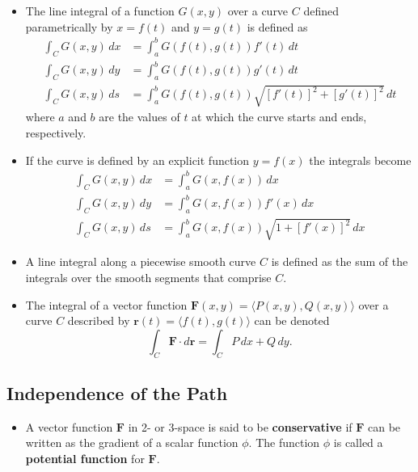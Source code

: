 \documentclass{article}
\begin{document}
\begin{itemize}
  \item The line integral of a function $G(x, y)$ over a curve $C$ defined parametrically by $x = f(t)$ and $y = g(t)$ is defined as \begin{align*}
          \int_C G(x, y) \,dx & = \int_a^b G(f(t), g(t)) f'(t) \,dt                        \\
          \int_C G(x, y) \,dy & = \int_a^b G(f(t), g(t)) g'(t) \,dt                        \\
          \int_C G(x, y) \,ds & = \int_a^b G(f(t), g(t)) \sqrt{[f'(t)]^2 + [g'(t)]^2} \,dt
        \end{align*} where $a$ and $b$ are the values of $t$ at which the curve starts and ends, respectively.

  \item If the curve is defined by an explicit function $y = f(x)$ the integrals become \begin{align*}
          \int_C G(x, y) \,dx & = \int_a^b G(x, f(x)) \,dx                      \\
          \int_C G(x, y) \,dy & = \int_a^b G(x, f(x)) f'(x) \,dx                \\
          \int_C G(x, y) \,ds & = \int_a^b G(x, f(x)) \sqrt{1 + [f'(x)]^2} \,dx
        \end{align*}

  \item A line integral along a piecewise smooth curve $C$ is defined as the sum of the integrals over the smooth segments that comprise $C$.

  \item The integral of a vector function $\mathbf{F}(x, y) = \langle P(x, y), Q(x, y)\rangle$ over a curve $C$ described by $\mathbf{r}(t) = \langle f(t), g(t) \rangle$ can be denoted \[\int_C \mathbf{F} \cdot d \mathbf{r} = \int_C P \,dx + Q \,dy.\]
\end{itemize}

\subsection{Independence of the Path}

\begin{itemize}
  \item A vector function $\mathbf{F}$ in 2- or 3-space is said to be \textbf{conservative} if $\mathbf{F}$ can be written as the gradient of a scalar function $\phi$. The function $\phi$ is called a \textbf{potential function} for $\mathbf{F}$.
\end{itemize}
\end{document}
